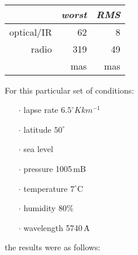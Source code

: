 \documentclass[11pt,twoside]{article}
\begin{document}
{\begin{enumerate}
        \vspace{2ex}

        ~~~~~~~~~~
        \begin{tabular}{|r|r|r|} \hline
              & {\it worst} & {\it RMS} \\ \hline
              optical/IR & 62 & 8 \\
              radio & 319 & 49 \\ \hline
              & mas & mas \\ \hline
        \end{tabular}

        \vspace{3ex}

        For this particular set of conditions:
        \begin{itemize}
        \item [$\cdot$] lapse rate $6.5^\circ K km^{-1}$
        \item [$\cdot$] latitude $50^\circ$
        \item [$\cdot$] sea level
        \item [$\cdot$] pressure 1005\,mB
        \item [$\cdot$] temperature $7^\circ$C
        \item [$\cdot$] humidity 80\%
        \item [$\cdot$] wavelength 5740\,\.{A}
        \end{itemize}
        the results were as follows:

        \vspace{2ex}


\end{enumerate}}
\end{document}
